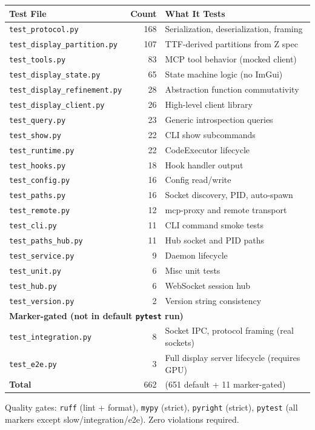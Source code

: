 \documentclass[a4paper,10pt]{article}
\begin{document}
\begin{center}
\begin{tabular}{lrl}
\toprule
\textbf{Test File} & \textbf{Count} & \textbf{What It Tests} \\
\midrule
\texttt{test\_protocol.py}            & 168 & Serialization, deserialization, framing \\
\texttt{test\_display\_partition.py}   & 107 & TTF-derived partitions from Z spec \\
\texttt{test\_tools.py}               & 83  & MCP tool behavior (mocked client) \\
\texttt{test\_display\_state.py}       & 65  & State machine logic (no ImGui) \\
\texttt{test\_display\_refinement.py}  & 28  & Abstraction function commutativity \\
\texttt{test\_display\_client.py}      & 26  & High-level client library \\
\texttt{test\_query.py}               & 23  & Generic introspection queries \\
\texttt{test\_show.py}                & 22  & CLI show subcommands \\
\texttt{test\_runtime.py}             & 22  & CodeExecutor lifecycle \\
\texttt{test\_hooks.py}               & 18  & Hook handler output \\
\texttt{test\_config.py}              & 16  & Config read/write \\
\texttt{test\_paths.py}               & 16  & Socket discovery, PID, auto-spawn \\
\texttt{test\_remote.py}              & 12  & mcp-proxy and remote transport \\
\texttt{test\_cli.py}                 & 11  & CLI command smoke tests \\
\texttt{test\_paths\_hub.py}          & 11  & Hub socket and PID paths \\
\texttt{test\_service.py}             & 9   & Daemon lifecycle \\
\texttt{test\_unit.py}                & 6   & Misc unit tests \\
\texttt{test\_hub.py}                 & 6   & WebSocket session hub \\
\texttt{test\_version.py}             & 2   & Version string consistency \\
\midrule
\multicolumn{3}{l}{\textbf{Marker-gated (not in default \texttt{pytest} run)}} \\
\midrule
\texttt{test\_integration.py}         & 8   & Socket IPC, protocol framing (real sockets) \\
\texttt{test\_e2e.py}                 & 3   & Full display server lifecycle (requires GPU) \\
\midrule
\textbf{Total}                        & 662 & (651 default + 11 marker-gated) \\
\bottomrule
\end{tabular}
\end{center}

Quality gates: \texttt{ruff} (lint + format), \texttt{mypy} (strict),
\texttt{pyright} (strict), \texttt{pytest} (all markers except
slow/integration/e2e).  Zero violations required.
\end{document}
